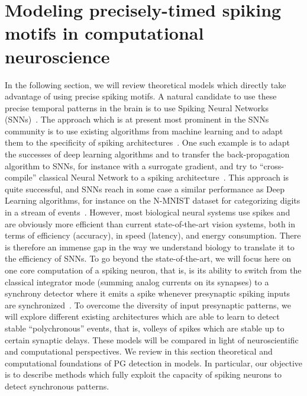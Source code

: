 \documentclass[brainsci, %
               review,submit,pdftex,moreauthors
               ]{Definitions/mdpi}
\begin{document}
\section{Modeling precisely-timed spiking motifs in computational neuroscience}
In the following section, we will review theoretical models which directly take advantage of using precise spiking motifs. 
A natural candidate to use these precise temporal patterns in the brain is to use Spiking Neural Networks (SNNs)~\citep{maass_networks_1997}. The approach which is at present most prominent in the SNNs community is to use existing algorithms from machine learning and to adapt them to the specificity of spiking architectures~\citep{goltz_fast_2021}. One such example is to adapt the successes of deep learning algorithms and to transfer the back-propagation algorithm to SNNs, for instance with a surrogate gradient, and try to ``cross-compile'' classical Neural Network to a spiking architecture~\citep{rueckauer_conversion_2017}. This approach is quite successful, and SNNs reach in some case a similar performance as Deep Learning algorithms, for instance on the N-MNIST dataset for categorizing digits in a stream of events~\citep{susi_nmnsd-spiking_2021}. However, most biological neural systems use spikes and are obviously more efficient than current state-of-the-art vision systems, both in terms of efficiency (accuracy), in speed (latency), and energy consumption. There is therefore an immense gap in the way we understand biology to translate it to the efficiency of SNNs.  To go beyond the state-of-the-art, we will focus here on one core computation of a spiking neuron, that is, is its ability to switch from the classical integrator mode (summing analog currents on its synapses) to a synchrony detector where it emits a spike whenever presynaptic spiking inputs are synchronized~\citep{abeles_role_1982,paugam-moisy_computing_2012}. To overcome the diversity of input presynaptic patterns, we will explore different existing architectures which are able to learn to detect stable ``polychronous'' events, that is, volleys of spikes which are stable up to certain synaptic delays. These models will be compared in light of neuroscientific and computational perspectives. We review in this section theoretical and computational foundations of PG detection in models. In particular, our objective is to describe methods which fully exploit the capacity of spiking neurons to detect synchronous patterns.
\end{document}
